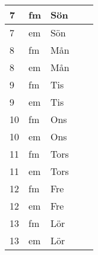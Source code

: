 \documentclass[a4paper]{article}
\begin{document}
\begin{table}[ht!]
\begin{tabular}{lllp{7cm}p{7cm}}
\multicolumn{1}{|l|}{7} & \multicolumn{1}{l|}{fm} & \multicolumn{1}{l|}{Sön} & \multicolumn{1}{l|}{} & \multicolumn{1}{l|}{} \\ \hline
\multicolumn{1}{|l|}{7} & \multicolumn{1}{l|}{em} & \multicolumn{1}{l|}{Sön} & \multicolumn{1}{l|}{} & \multicolumn{1}{l|}{} \\ \hline    

\multicolumn{1}{|l|}{8} & \multicolumn{1}{l|}{fm} & \multicolumn{1}{l|}{Mån} & \multicolumn{1}{l|}{} & \multicolumn{1}{l|}{} \\ \hline
\multicolumn{1}{|l|}{8} & \multicolumn{1}{l|}{em} & \multicolumn{1}{l|}{Mån} & \multicolumn{1}{l|}{} & \multicolumn{1}{l|}{} \\ \hline    

\multicolumn{1}{|l|}{9} & \multicolumn{1}{l|}{fm} & \multicolumn{1}{l|}{Tis} & \multicolumn{1}{l|}{} & \multicolumn{1}{l|}{} \\ \hline
\multicolumn{1}{|l|}{9} & \multicolumn{1}{l|}{em} & \multicolumn{1}{l|}{Tis} & \multicolumn{1}{l|}{} & \multicolumn{1}{l|}{} \\ \hline    

\multicolumn{1}{|l|}{10} & \multicolumn{1}{l|}{fm} & \multicolumn{1}{l|}{Ons} & \multicolumn{1}{l|}{} & \multicolumn{1}{l|}{} \\ \hline
\multicolumn{1}{|l|}{10} & \multicolumn{1}{l|}{em} & \multicolumn{1}{l|}{Ons} & \multicolumn{1}{l|}{} & \multicolumn{1}{l|}{} \\ \hline    

\multicolumn{1}{|l|}{11} & \multicolumn{1}{l|}{fm} & \multicolumn{1}{l|}{Tors} & \multicolumn{1}{l|}{} & \multicolumn{1}{l|}{} \\ \hline
\multicolumn{1}{|l|}{11} & \multicolumn{1}{l|}{em} & \multicolumn{1}{l|}{Tors} & \multicolumn{1}{l|}{} & \multicolumn{1}{l|}{} \\ \hline    

\multicolumn{1}{|l|}{12} & \multicolumn{1}{l|}{fm} & \multicolumn{1}{l|}{Fre} & \multicolumn{1}{l|}{} & \multicolumn{1}{l|}{} \\ \hline
\multicolumn{1}{|l|}{12} & \multicolumn{1}{l|}{em} & \multicolumn{1}{l|}{Fre} & \multicolumn{1}{l|}{} & \multicolumn{1}{l|}{} \\ \hline    

\multicolumn{1}{|l|}{13} & \multicolumn{1}{l|}{fm} & \multicolumn{1}{l|}{Lör} & \multicolumn{1}{l|}{} & \multicolumn{1}{l|}{} \\ \hline
\multicolumn{1}{|l|}{13} & \multicolumn{1}{l|}{em} & \multicolumn{1}{l|}{Lör} & \multicolumn{1}{l|}{} & \multicolumn{1}{l|}{} \\ \hline    


\end{tabular}
\end{table}
\end{document}
